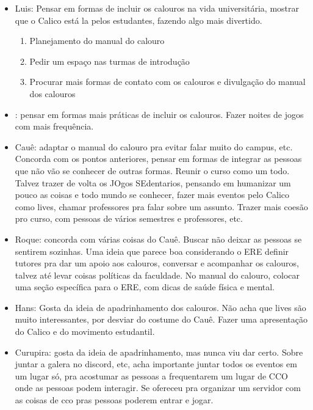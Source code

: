 \documentclass{ata-calico}
\begin{document}
\begin{itemize}
\item Luis: Pensar em formas de incluir os calouros na vida universitária, mostrar que o Calico está la pelos estudantes, fazendo algo mais divertido.
\begin{enumerate}
\item Planejamento do manual do calouro
\item Pedir um espaço nas turmas de introdução
\item Procurar mais formas de contato com os calouros e divulgação do manual dos calouros
\end{enumerate}

\item : pensar em formas mais práticas de incluir os calouros. Fazer noites de jogos com mais frequência. 

\item Cauê: adaptar o manual do calouro pra evitar falar muito do campus, etc. Concorda com os pontos anteriores, pensar em formas de integrar as pessoas que não vão 
se conhecer de outras formas. Reunir o curso como um todo. Talvez trazer de volta os JOgos SEdentarios, pensando em humanizar um pouco as coisas e todo mundo se conhecer,
fazer mais eventos pelo Calico como lives, chamar professores pra falar sobre um assunto. Trazer mais coesão pro curso, com pessoas de vários semestres e professores, etc.

\item Roque: concorda com várias coisas do Cauê. Buscar não deixar as pessoas se sentirem sozinhas. Uma ideia que parece boa considerando o ERE definir tutores pra dar um apoio aos calouros,
conversar e acompanhar os calouros, talvez até levar coisas políticas da faculdade. No manual do calouro, colocar uma seção específica para o ERE, com dicas de saúde física e mental.

\item Hans: Gosta da ideia de apadrinhamento dos calouros. Não acha que lives são muito interessantes, por desviar do costume do Cauê. Fazer uma apresentação do Calico e do movimento estudantil.

\item Curupira: gosta da ideia de apadrinhamento, mas nunca viu dar certo. Sobre juntar a galera no discord, etc, acha importante juntar todos os eventos em um lugar só, pra acostumar as 
pessoas a frequentarem um lugar de CCO onde as pessoas podem interagir. Se ofereceu pra organizar um servidor com as coisas de cco pras pessoas poderem entrar e jogar.


\end{itemize}
\end{document}
